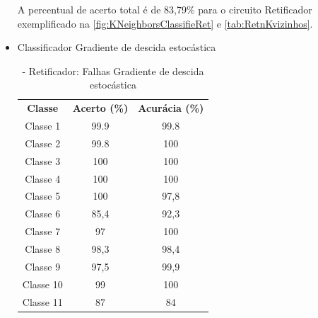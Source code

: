 \begin{itemize}
A percentual de acerto total é de 83,79\% para o circuito Retificador exemplificado na \ref{fig:KNeighborsClassifieRet} e \ref{tab:RetnKvizinhos}. 
\newpage

 \item Classificador Gradiente de descida estocástica
 
 \begin{table}[ht]
\centering
\begin{tabular}{ccc}
\textbf{Classe} & \textbf{Acerto (\%)} & \textbf{Acurácia (\%)} \\
Classe 1        & 99.9                  & 99.8                    \\
Classe 2        & 99.8                  & 100                    \\
Classe 3        & 100                  & 100                    \\
Classe 4        & 100                  & 100                    \\
Classe 5        & 100                  & 97,8                    \\
Classe 6        & 85,4                  & 92,3                    \\
Classe 7        & 97                  & 100                    \\
Classe 8        & 98,3                  & 98,4                    \\
Classe 9        & 97,5                  & 99,9                    \\
Classe 10       & 99                  & 100                    \\
Classe 11       & 87                  & 84                                   
\end{tabular}
\caption{\label{tab:RetnGDE}- Retificador: Falhas Gradiente de descida estocástica}
\end{table}


\end{itemize}

